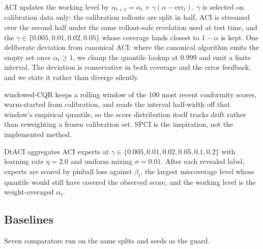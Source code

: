 \documentclass{article}
\begin{document}
ACI updates the working level by $\alpha_{t+1} = \alpha_t + \gamma(\alpha -
\mathrm{err}_t)$. $\gamma$ is selected on calibration data only: the calibration
rollouts are split in half, ACI is streamed over the second half under the same
rollout-safe revelation used at test time, and the $\gamma \in \{0.005, 0.01, 0.02,
0.05\}$ whose coverage lands closest to $1{-}\alpha$ is kept. One deliberate deviation
from canonical ACI: where the canonical algorithm emits the empty set once $\alpha_t
\geq 1$, we clamp the quantile lookup at 0.999 and emit a finite interval. The
deviation is conservative in both coverage and the error feedback, and we state it
rather than diverge silently.

windowed-CQR keeps a rolling window of the 100 most recent conformity scores,
warm-started from calibration, and reads the interval half-width off that window's
empirical quantile, so the score distribution itself tracks drift rather than
reweighting a frozen calibration set. SPCI \cite{xu2023spci} is the inspiration, not
the implemented method.

DtACI aggregates ACI experts at $\gamma \in \{0.005, 0.01, 0.02, 0.05, 0.1, 0.2\}$
with learning rate $\eta = 2.0$ and uniform mixing $\sigma = 0.01$. After each revealed
label, experts are scored by pinball loss against $\beta_t$, the largest miscoverage
level whose quantile would still have covered the observed score, and the working level
is the weight-averaged $\alpha_t$.

\subsection{Baselines}

Seven comparators run on the same splits and seeds as the guard.
\end{document}

